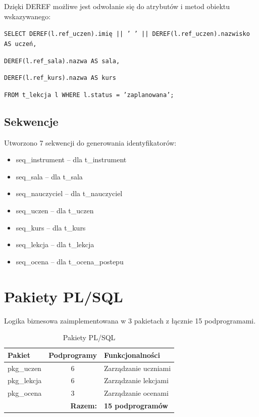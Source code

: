 \documentclass[12pt,a4paper]{article}
\begin{document}
Dzięki DEREF możliwe jest odwołanie się do atrybutów i metod obiektu wskazywanego:

\texttt{SELECT DEREF(l.ref\_uczen).imię || ' ' || DEREF(l.ref\_uczen).nazwisko AS uczeń,}

\texttt{\hspace{1.5cm}DEREF(l.ref\_sala).nazwa AS sala,}

\texttt{\hspace{1.5cm}DEREF(l.ref\_kurs).nazwa AS kurs}

\texttt{FROM t\_lekcja l WHERE l.status = 'zaplanowana';}

\subsection{Sekwencje}

Utworzono 7 sekwencji do generowania identyfikatorów:

\begin{itemize}[nosep]
    \item seq\_instrument -- dla t\_instrument
    \item seq\_sala -- dla t\_sala
    \item seq\_nauczyciel -- dla t\_nauczyciel
    \item seq\_uczen -- dla t\_uczen
    \item seq\_kurs -- dla t\_kurs
    \item seq\_lekcja -- dla t\_lekcja
    \item seq\_ocena -- dla t\_ocena\_postepu
\end{itemize}

\section{Pakiety PL/SQL}

Logika biznesowa zaimplementowana w 3 pakietach z łącznie 15 podprogramami.

\begin{table}[h]
\centering
\begin{tabular}{|l|c|p{7cm}|}
\hline
\textbf{Pakiet} & \textbf{Podprogramy} & \textbf{Funkcjonalności} \\
\hline
pkg\_uczen & 6 & Zarządzanie uczniami \\
pkg\_lekcja & 6 & Zarządzanie lekcjami \\
pkg\_ocena & 3 & Zarządzanie ocenami \\
\hline
\multicolumn{2}{|r|}{\textbf{Razem:}} & \textbf{15 podprogramów} \\
\hline
\end{tabular}
\caption{Pakiety PL/SQL}
\end{table}
\end{document}
